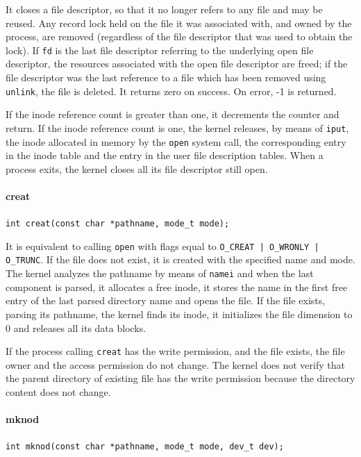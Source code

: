 It closes a file descriptor, so that it no longer refers to any file and may be reused. Any record lock held on the file it was associated with, and owned by the process, are removed (regardless of the file descriptor that was used to obtain the lock). If \texttt{fd} is the last file descriptor referring to the underlying open file descriptor, the resources associated with the open file descriptor are freed; if the file descriptor was the last reference to a file which has been removed using \texttt{unlink}, the file is deleted. It returns zero on success. On error, -1 is returned.

If the inode reference count is greater than one, it decrements the counter and return. If the inode reference count is one, the kernel releases, by means of \texttt{iput}, the inode allocated in memory by the \texttt{open} system call, the corresponding entry in the inode table and the entry in the user file description tables. When a process exits, the kernel closes all its file descriptor still open. 

\paragraph{creat}
\texttt{int creat(const char *pathname, mode\_t mode);}

It is equivalent to calling \texttt{open} with flags equal to \texttt{O\_CREAT | O\_WRONLY | O\_TRUNC}. If the file does not exist, it is created with the specified name and mode. The kernel analyzes the pathname by means of \texttt{namei} and when the last component is parsed, it allocates a free inode, it stores the name in the first free entry of the last parsed directory name and opens the file. If the file exists, parsing its pathname, the kernel finds its inode, it initializes the file dimension to 0 and releases all its data blocks.

If the process calling \texttt{creat} has the write permission, and the file exists, the file owner and the access permission do not change. The kernel does not verify that the parent directory of existing file has the write permission because the directory content does not change.

\paragraph{mknod}
\texttt{int mknod(const char *pathname, mode\_t mode, dev\_t dev);}

